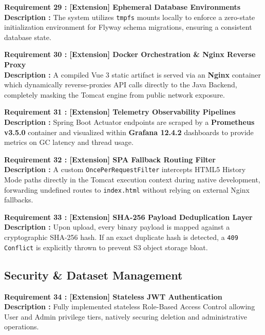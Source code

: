 \documentclass[12pt, a4paper]{article}
\begin{document}
\noindent\textbf{Requirement 29 : [Extension] Ephemeral Database Environments}\\
\textbf{Description :} The system utilizes \texttt{tmpfs} mounts locally to enforce a zero-state initialization environment for Flyway schema migrations, ensuring a consistent database state.
\vspace{1em}

\noindent\textbf{Requirement 30 : [Extension] Docker Orchestration \& Nginx Reverse Proxy}\\
\textbf{Description :} A compiled Vue 3 static artifact is served via an \textbf{Nginx} container which dynamically reverse-proxies API calls directly to the Java Backend, completely masking the Tomcat engine from public network exposure.
\vspace{1em}

\noindent\textbf{Requirement 31 : [Extension] Telemetry Observability Pipelines}\\
\textbf{Description :} Spring Boot Actuator endpoints are scraped by a \textbf{Prometheus v3.5.0} container and visualized within \textbf{Grafana 12.4.2} dashboards to provide metrics on GC latency and thread usage.
\vspace{1em}

\noindent\textbf{Requirement 32 : [Extension] SPA Fallback Routing Filter}\\
\textbf{Description :} A custom \texttt{OncePerRequestFilter} intercepts HTML5 History Mode paths directly in the Tomcat execution context during native development, forwarding undefined routes to \texttt{index.html} without relying on external Nginx fallbacks.
\vspace{1em}

\noindent\textbf{Requirement 33 : [Extension] SHA-256 Payload Deduplication Layer}\\
\textbf{Description :} Upon upload, every binary payload is mapped against a cryptographic SHA-256 hash. If an exact duplicate hash is detected, a \texttt{409 Conflict} is explicitly thrown to prevent S3 object storage bloat.

\subsection*{Security \& Dataset Management}

\noindent\textbf{Requirement 34 : [Extension] Stateless JWT Authentication}\\
\textbf{Description :} Fully implemented stateless Role-Based Access Control allowing User and Admin privilege tiers, natively securing deletion and administrative operations.
\vspace{1em}
\end{document}
